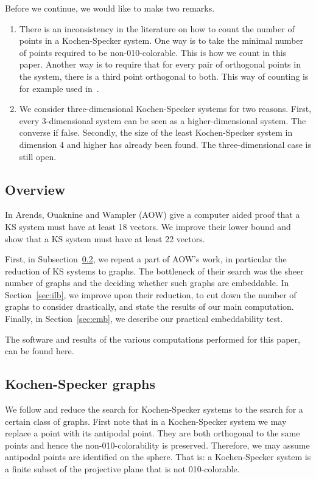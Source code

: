 \documentclass{report}
\begin{document}
Before we continue, we would like to make two remarks.
\begin{enumerate}
\item
There is an inconsistency in the literature on how to count the number
of points in a Kochen-Specker system.  One way is to take the minimal
number of points required to be non-010-colorable.
This is how we count in this paper.
Another way is to require that for every pair of orthogonal points
in the system, there is a third point orthogonal to both.
This way of counting is for example used in~\cite{pavivcic}.
\item
We consider three-dimensional Kochen-Specker systems
for two reasons.
First, every 3-dimensional system can be seen as a higher-dimensional
            system.   The converse if false.
Secondly, the size of the least Kochen-Specker system
            in dimension 4 and higher has already been found.\cite{pavivcic}
            The three-dimensional case is still open.
\end{enumerate}

\subsection{Overview}
In \cite{aow11} Arends, Ouaknine and Wampler (AOW) give a computer aided proof
that a KS system must have at least 18 vectors.  We improve their lower bound
and show that a KS system must have at least 22 vectors.

First, in Subsection~\ref{sec:ksgraphs},
we repeat a part of AOW's work, in particular the reduction of
KS systems to graphs.
The bottleneck of their search was the sheer number of graphs
and the deciding whether such graphs are embeddable.
In Section~\ref{sec:ilb},
we improve upon their reduction,
to cut down the number of graphs to consider drastically,
and state the results of our main computation.
Finally, in Section~\ref{sec:emb},
we describe our practical embeddability test.

The software and results of the various computations performed for
this paper, can be found here\cite{GH}.

\subsection{Kochen-Specker graphs}
\label{sec:ksgraphs}
We follow \cite{aow11} and reduce the search for Kochen-Specker systems
to the search for a certain class of graphs.
First note that in a Kochen-Specker system we may replace a point with its
antipodal point.  They are both orthogonal to the same points and hence
the non-010-colorability is preserved.
Therefore, we may assume antipodal points are identified on the sphere.
That is: a Kochen-Specker system is a finite subset of the projective plane
that is not 010-colorable.
\end{document}
